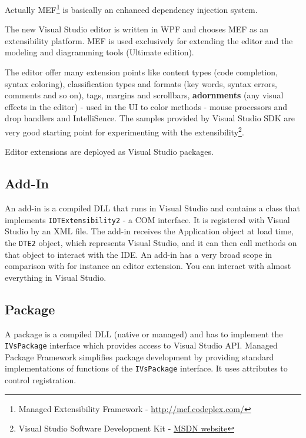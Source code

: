 Actually MEF\footnote{Managed Extensibility Framework - \href{http://mef.codeplex.com/}{http://mef.codeplex.com/} } 
is basically an enhanced dependency injection system. 

The new Visual Studio editor is written in WPF and chooses MEF as an extensibility platform. MEF is used exclusively for extending the editor and the modeling and diagramming tools (Ultimate edition).

The editor offer many extension points like content types (code completion, syntax coloring), classification types and formats (key words, syntax errors, comments and so on), tags, margins and scrollbars, \textbf{adornments} (any visual effects in the editor) - used in the UI to color methods - mouse processors and drop handlers and IntelliSence. The samples provided by Visual Studio SDK are very good starting point for experimenting with the extensibility\footnote{Visual Studio Software Development Kit - \href{http://msdn.microsoft.com/en-us/library/bb166441(v=VS.100).aspx}{MSDN website}}.

Editor extensions are deployed as Visual Studio packages.

\subsection{Add-In}
An add-in is a compiled DLL that runs in Visual Studio and contains a class that implements \texttt{IDTExtensibility2} - a COM interface. It is registered with Visual Studio by an XML file. The add-in receives the Application object  at load time, the \texttt{DTE2} object, which represents Visual Studio, and it can then call methods on that object to interact with the IDE. An add-in has a very broad scope in comparison with for instance an editor extension. You can interact with almost everything in Visual Studio.

\subsection{Package}
A package is a compiled DLL (native or managed) and has to implement the \texttt{IVsPackage} interface which provides access to Visual Studio API. Managed Package Framework simplifies package development by providing standard implementations of functions of the \texttt{IVsPackage} interface. It uses attributes to control registration.

